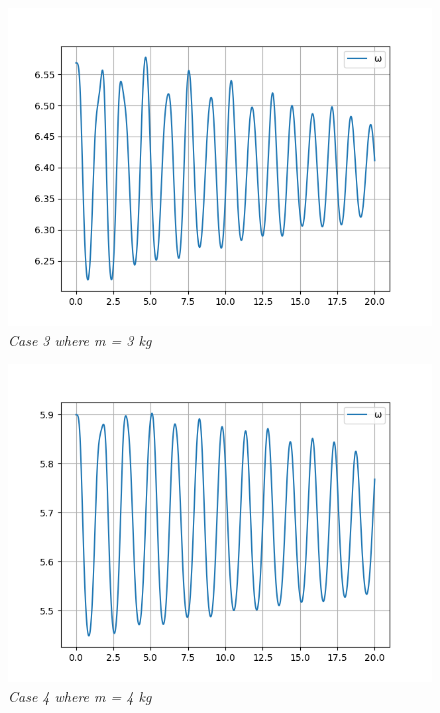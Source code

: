         \begin{figure}[H]
            \centering
            \includegraphics{Appendix/RSimPictures/AF/afm3.png}
            \caption{\textit{Case 3 where m = 3 kg}}
            \label{}
        \end{figure}
            
        \begin{figure}[H]
            \centering
            \includegraphics{Appendix/RSimPictures/AF/afm4.png}
            \caption{\textit{Case 4 where m = 4 kg}}
            \label{}
        \end{figure}
            
